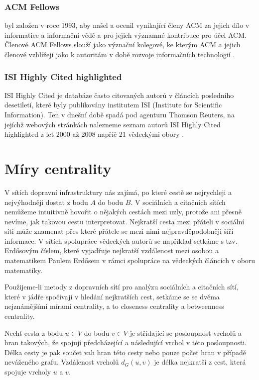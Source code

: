 \documentclass{bakalarka}
\begin{document}
\subsubsection{ACM Fellows}
 byl založen v roce 1993, aby našel a ocenil
vynikající členy ACM za jejich dílo v informatice a informační vědě a pro
jejich významné kontribuce pro účel ACM. Členové ACM Fellows slouží jako
význační kolegové, ke kterým ACM a jejich členové vzhlížejí jako k autoritám v
době rozvoje informačních technologií \cite{acmfellows}.

\subsubsection{ISI Highly Cited highlighted}
ISI Highly Cited je databáze často citovaných autorů v článcích posledního
desetiletí, které byly publikovány institutem ISI (Institute for Scientific
Information). Ten v dnešní době spadá pod agenturu Thomson Reuters, na jejíchž
webových stránkách nalezneme seznam autorů ISI Highly Cited highlighted z let
2000 až 2008 napříč 21 vědeckými obory \cite{highlycited}.

\section{Míry centrality}
V sítích dopravní infrastruktury nás zajímá, po které cestě se nejrychleji a
nejvýhodněji dostat z bodu $A$ do bodu $B$. V sociálních a citačních sítích
nemůžeme intuitivně hovořit o nějakých cestách mezi uzly, protože ani přesně
nevíme, jak takovou cestu interpretovat. Nejkratší cesta mezi přáteli v
sociální síti může znamenat přes které přátele se mezi nimi nejpravděpodobněji
šíří informace. V sítích spolupráce vědeckých autorů se například setkáme s
tzv. Erdősovým číslem, které vyjadřuje nejkratší vzdálenost mezi osobou a
matematikem Paulem Erdősem v rámci spolupráce na vědeckých článcích v oboru
matematiky.

Použijeme-li metody z dopravních sítí pro analýzu sociálních a citačních sítí,
které v jádře spočívají v hledání nejkratších cest, setkáme se se dvěma
nejznámějšími mírami centrality, a to closeness centrality a betweenness
centrality.

Nechť cesta z bodu $u \in V$ do bodu $v \in V$ je střídající se posloupnost
vrcholů a hran takových, že spojují předcházející a následující vrchol v této
posloupnosti. Délka cesty je pak součet vah hran této cesty nebo pouze počet
hran v případě neváženého grafu. Vzdálenost vrcholů $d_G(u, v)$ je délka
nejkratší z cest, která spojuje vrcholy $u$ a $v$.
\end{document}
